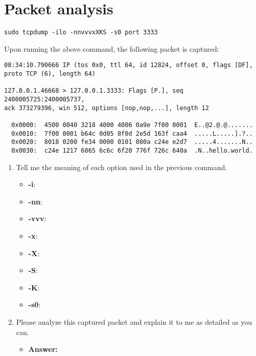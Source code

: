 \documentclass{swfulabreport}
\begin{document}
\maketitle

\hypertarget{packet-analysis}{%
\section{Packet analysis}\label{packet-analysis}}

\begin{verbatim}
sudo tcpdump -ilo -nnvvvxXKS -s0 port 3333
\end{verbatim}

Upon running the above command, the following packet is captured:

\begin{verbatim}
08:34:10.790666 IP (tos 0x0, ttl 64, id 12824, offset 0, flags [DF],
proto TCP (6), length 64)

127.0.0.1.46668 > 127.0.0.1.3333: Flags [P.], seq 2400005725:2400005737,
ack 373279396, win 512, options [nop,nop,...], length 12

  0x0000:  4500 0040 3218 4000 4006 0a9e 7f00 0001  E..@2.@.@.......
  0x0010:  7f00 0001 b64c 0d05 8f0d 2e5d 163f caa4  .....L.....].?..
  0x0020:  8018 0200 fe34 0000 0101 080a c24e e2d7  .....4.......N..
  0x0030:  c24e 1217 6865 6c6c 6f20 776f 726c 640a  .N..hello.world.
\end{verbatim}

\begin{enumerate}
\def\labelenumi{\arabic{enumi}.}
\item
  Tell me the meaning of each option used in the previous command.

  \begin{itemize}
  \tightlist
  \item
    \textbf{-i}:
  \item
    \textbf{-nn}:
  \item
    \textbf{-vvv}:
  \item
    \textbf{-x}:
  \item
    \textbf{-X}:
  \item
    \textbf{-S}:
  \item
    \textbf{-K}:
  \item
    \textbf{-s0}:
  \end{itemize}
\item
  Please analyze this captured packet and explain it to me as detailed
  as you can.

  \begin{itemize}
  \tightlist
  \item
    \textbf{Answer:}
  \end{itemize}
\end{enumerate}
\end{document}
